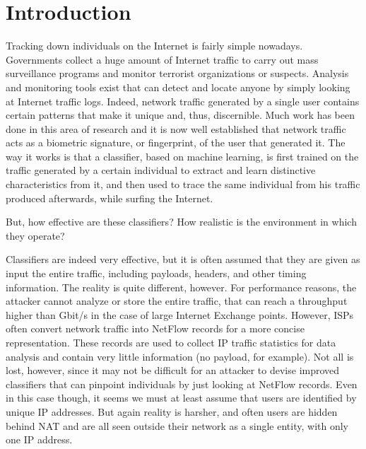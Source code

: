 \documentclass[10pt,conference,compsocconf,letterpaper]{IEEEtran}
\begin{document}
\section{Introduction}

Tracking down individuals on the Internet is fairly simple nowadays. 
Governments collect a huge amount of Internet traffic to carry out mass surveillance programs
and  monitor terrorist organizations or suspects. Analysis and monitoring tools 
exist that can detect and locate anyone by simply looking at Internet traffic logs. 
Indeed, network traffic generated by a single user contains certain patterns that make 
it unique and, thus, discernible. Much work has been done in this area of research and it is now well established that network traffic acts as a biometric signature, or fingerprint, of the user that generated it.
The way it works is that a classifier, based on machine learning, is first trained on the traffic generated by a certain individual to extract and learn distinctive characteristics from it, and then used to trace the same individual from his traffic produced afterwards, while surfing the Internet. 

But, how effective are these classifiers? How realistic is the environment in which they operate?

Classifiers are indeed very effective, but it is often assumed that they are given as input the entire traffic, including payloads, headers, and other timing information. The reality is quite different, however. For performance reasons, the attacker cannot analyze or store the entire traffic, that can reach a throughput higher than  Gbit/s in the case of large Internet Exchange points. However, ISPs often convert network traffic into NetFlow records for a more concise representation. These records are used to collect IP traffic statistics for data analysis and contain very little information (no payload, for example). Not all is lost, however, since it may not be difficult for an attacker to devise improved classifiers that can pinpoint individuals by just looking at NetFlow records. Even in this case though, it seems we must at least assume that users are identified by unique IP addresses.  But again reality is harsher, and often users are hidden behind NAT and are all seen outside their network as a single entity, with only one IP address. 
\end{document}

